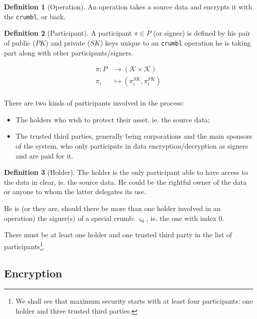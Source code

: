 \documentclass[twoside,twocolumn]{article}
\theoremstyle{definition}
\newtheorem{definition}{Definition}
\theoremstyle{remark}
\begin{document}
\begin{definition}[Operation]
    An operation takes a source data and encrypts it with the \texttt{crumbl}, or back.
\end{definition}

\begin{definition}[Participant]
    \label{participant}
    A participant $\pi \in P$ (or signer) is defined by his pair of public ($PK$) and private ($SK$) keys unique to an \texttt{crumbl} operation 
    he is taking part along with other participants/signers.

    \begin{equation}
        \label{eq:participant}
        \begin{array}{rl}
            \pi: P &\to (\mathcal{K} \times \mathcal{K}) \\
                \pi_i &\mapsto (\pi_i^{SK}, \pi_i^{PK}) \\
        \end{array}
    \end{equation}

    There are two kinds of participants involved in the process:
    \begin{itemize}
        \item The holders who wish to protect their asset, ie. the source data;
        \item The trusted third parties, generally being corporations and the main sponsors of the system, who only participate in data 
            encryption/decryption as signers and are paid for it.
    \end{itemize}
\end{definition}

\begin{definition}[Holder]
    The holder is the only participant able to have access to the data in clear, ie. the source data.
    He could be the rightful owner of the data or anyone to whom the latter delegates its use.

    He is (or they are, should there be more than one holder involved in an operation) the signer(s) of a special crumb: $\varsigma_0$, ie. the one 
    with index $0$.
\end{definition}

There must be at least one holder and one trusted third party in the list of participants\footnote{We shall see that maximum security starts with at 
least four participants: one holder and three trusted third parties.}.

\subsection{Encryption}
\end{document}
